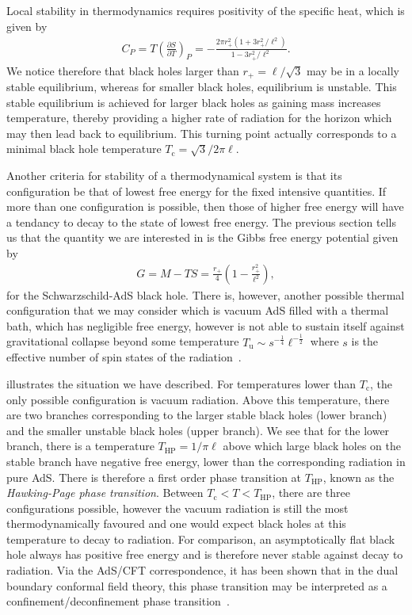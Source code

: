 \documentclass[
twoside,
openright,
frontopenright
]{dmathesis}
\begin{document}
Local stability in thermodynamics requires positivity of the specific heat,
which is given by
\begin{align}
  C_P = T \left(\frac{\partial S}{\partial T}\right)_P =
  -\frac{2\pi r_+^2(1+3r_+^2/\ell^2)}{1-3r_+^2/\ell^2} .
\end{align}
We notice therefore that black holes larger than $r_+ = \ell/\sqrt{3}$ may be in
a locally stable equilibrium, whereas for smaller black holes, equilibrium is
unstable. This stable equilibrium is achieved for larger black holes as gaining
mass increases temperature, thereby providing a higher rate of radiation for the
horizon which may then lead back to equilibrium. This turning point actually
corresponds to a minimal black hole temperature
$T_\mathrm{c} = \sqrt{3}/2\pi\ell$.

Another criteria for stability of a thermodynamical system is that its
configuration be that of lowest free energy for the fixed intensive
quantities. If more than one configuration is possible, then those of higher
free energy will have a tendancy to decay to the state of lowest free
energy. The previous section tells us that the quantity we are interested in is
the Gibbs free energy potential given by
\begin{align}
  G = M - TS = \frac{r_+}{4}\left(1-\frac{r_+^2}{\ell^2}\right),
\end{align}
for the Schwarzschild-AdS black hole. There is, however, another possible
thermal configuration that we may consider which is vacuum AdS filled with a
thermal bath, which has negligible free energy, however is not able to sustain
itself against gravitational collapse beyond some temperature $T_\mathrm{u} \sim
s^{-\frac14} \ell^{-\frac12}$ where $s$ is the effective number of spin states
of the radiation~\cite{Hawking:1982dh}. 

 illustrates the situation we have described. For
temperatures lower than $T_\mathrm{c}$, the only possible configuration is
vacuum radiation. Above this temperature, there are two branches corresponding
to the larger stable black holes (lower branch) and the smaller unstable black
holes (upper branch). We see that for the lower branch, there is a temperature
$T_\mathrm{HP} = 1/\pi\ell$ above which large black holes on the stable branch
have negative free energy, lower than the corresponding radiation in pure
AdS. There is therefore a first order phase transition at $T_\mathrm{HP}$, known
as the \emph{Hawking-Page phase transition}. Between
$T_\mathrm{c}<T<T_\mathrm{HP}$, there are three configurations possible, however
the vacuum radiation is still the most thermodynamically favoured and one would
expect black holes at this temperature to decay to radiation. For comparison, an
asymptotically flat black hole always has positive free energy and is therefore
never stable against decay to radiation. Via the AdS/CFT correspondence, it has
been shown that in the dual boundary conformal field theory, this phase
transition may be interpreted as a confinement/deconfinement phase
transition~\cite{Witten:1998zw}.
\end{document}
